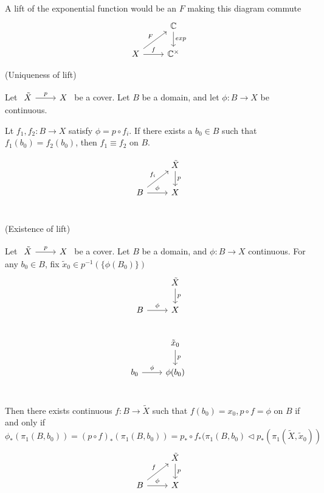 \documentclass[x11names,reqno,14pt]{extarticle}
\begin{document}
A lift of the exponential function would be an $F$ making this diagram commute
\[
\begin{tikzcd}
& \C \ar[d, "exp"]\\
X\ar[ur, "F"] \ar[r, "f"] & \C^\times
\end{tikzcd}
\]

\thm (Uniqueness of lift)

Let $\begin{tikzcd}\tilde{X}\ar[r, "p"] & X \end{tikzcd}$ be a cover. Let $B$ be a domain, and let $\phi:B\to X$ be continuous. 

Lt $f_1, f_2:B\to X$ satisfy $\phi = p \circ f_i$. If there exists a $b_0 \in B$ such that $f_1(b_0) = f_2(b_0)$, then $f_1 \equiv f_2$ on $B$. 

\[
\begin{tikzcd}
& \tilde{X} \ar[d, "p"] \\
B\ar[ur, "f_i"] \ar[r, "\phi"] & X \\ 
\end{tikzcd}
\]

\thm (Existence of lift)

Let $\begin{tikzcd} \tilde{X} \ar[r, "p"] & X \end{tikzcd}$ be a cover. Let $B$ be a domain, and $\phi:B\to X$ continuous. For any $b_0 \in B$, fix $\tilde{x}_0 \in p^{-1}(\{\phi(B_0)\})$
\[
\begin{tikzcd}
& \tilde{X} \ar[d, "p"] \\ B \ar[r, "\phi"] & X \\ 
\end{tikzcd}
\]
\[
\begin{tikzcd}
& \tilde{x}_0 \ar[d, "p"] \\
b_0 \ar[r, "\phi"] & \phi(b_0) \\
\end{tikzcd}
\]

Then there exists continuous $f:B\to\tilde{X}$ such that $f(b_0) = x_0, p \circ f = \phi$ on $B$ if and only if $\phi_*(\pi_1(B, b_0)) = (p \circ f)_*(\pi_1(B, b_0)) = p_* \circ f_*(\pi_1(B, b_0) \lhd p_*(\pi_1(\tilde{X}, \tilde{x}_0))$
\[
\begin{tikzcd}
& \tilde{X} \ar[d, "p"] \\ B \ar[ur, "f"] \ar[r, "\phi"] & X \\
\end{tikzcd}
\]

\cor
\end{document}
